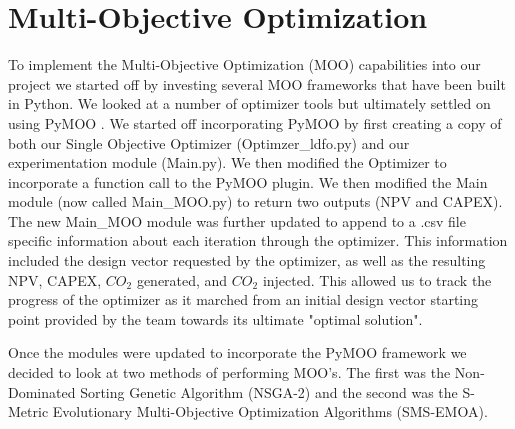 \documentclass[balance,upint,subscriptcorrection,varvw,mathalfa=cal=boondoxo,spanish,french,vietnamese,russian,greek,pdf-a,colorlinks]{asmeconf}
\begin{document}
\begin{table}[!btp]
\caption[Table]{PSO Tuning}\label{PSO_tuning:1}
\end{table}

 


\section{Multi-Objective Optimization}
To implement the Multi-Objective Optimization (MOO) capabilities into our project we started off by investing several MOO frameworks that have been built in Python. We looked at a number of optimizer tools but ultimately settled on using PyMOO \cite{Blank2020}. We started off incorporating PyMOO by first creating a copy of both our Single Objective Optimizer (Optimzer_ldfo.py) and our experimentation module (Main.py). We then modified the Optimizer to incorporate a function call to the PyMOO plugin. We then modified the Main module (now called Main_MOO.py) to return two outputs (NPV and CAPEX). The new Main_MOO module was further updated to append to a .csv file specific information about each iteration through the optimizer. This information included the design vector requested by the optimizer, as well as the resulting NPV, CAPEX, $CO_{2}$ generated, and $CO_{2}$ injected. This allowed us to track the progress of the optimizer as it marched from an initial design vector starting point provided by the team towards its ultimate "optimal solution". 

Once the modules were updated to incorporate the PyMOO framework we decided to look at two methods of performing MOO's. The first was the Non-Dominated Sorting Genetic Algorithm (NSGA-2) and the second was the S-Metric Evolutionary Multi-Objective Optimization Algorithms (SMS-EMOA). 
\end{document}
